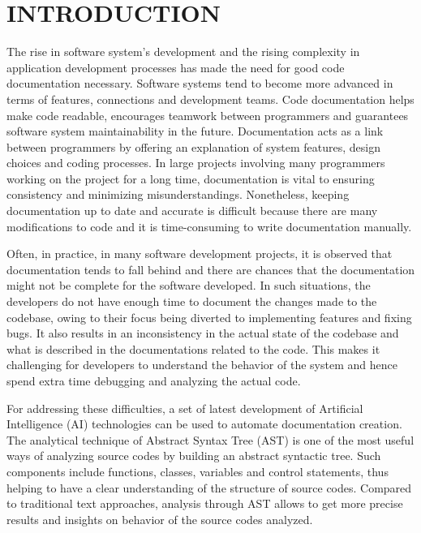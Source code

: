 \patchcmd{\chapter}{\thispagestyle{plain}}{\thispagestyle{fancy}}{}

\chapter{INTRODUCTION}
\patchcmd{\chapter}{\thispagestyle{plain}}{\thispagestyle{fancy}}{}

\hspace{0.5 cm}
The rise in software system's development and the rising complexity in application development processes has made the need for good code documentation necessary.  Software systems tend to become more advanced in terms of features, connections and development teams. Code documentation helps make code readable, encourages teamwork between programmers and guarantees software system maintainability in the future. Documentation acts as a link between programmers by offering an explanation of system features, design choices and coding processes. In large projects involving many programmers working on the project for a long time, documentation is vital to ensuring consistency and minimizing misunderstandings. Nonetheless, keeping documentation up to date and accurate is difficult because there are many modifications to code and it is time-consuming to write documentation manually.
\par Often, in practice, in many software development projects, it is observed that documentation tends to fall behind and there are chances that the documentation might not be complete for the software developed. In such situations, the developers do not have enough time to document the changes made to the codebase, owing to their focus being diverted to implementing features and fixing bugs. It also results in an inconsistency in the actual state of the codebase and what is described in the documentations related to the code. This makes it challenging for developers to understand the behavior of the system and hence spend extra time debugging and analyzing the actual code.
\newpage
\par For addressing these difficulties, a set of latest development of Artificial Intelligence (AI) technologies can be used to automate documentation creation. The analytical technique of Abstract Syntax Tree (AST) is one of the most useful ways of analyzing source codes by building an abstract syntactic tree. Such components include functions, classes, variables and control statements, thus helping to have a clear understanding of the structure of source codes. Compared to traditional text approaches, analysis through AST allows to get more precise results and insights on behavior of the source codes analyzed. 

